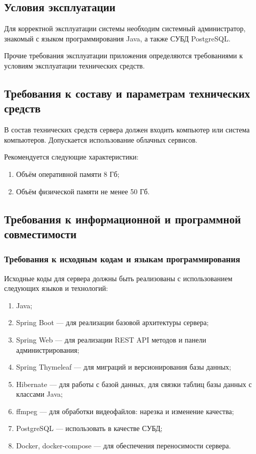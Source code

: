\subsection{Условия эксплуатации}

Для корректной эксплуатации системы необходим системный администратор, знакомый с языком программирования
Java, а также СУБД PostgreSQL.

Прочие требования эксплуатации приложения определяются требованиями к условиям эксплуатации технических средств.

\subsection{Требования к составу и параметрам технических средств}

В состав технических средств сервера должен входить компьютер или система компьютеров.
Допускается использование облачных сервисов.

Рекомендуется следующие характеристики:
\begin{enumerate}
    \item Объём оперативной памяти 8 Гб;
    \item Объём физической памяти не менее 50 Гб.
\end{enumerate}

\subsection{Требования к информационной и программной совместимости}

\subsubsection{Требования к исходным кодам и языкам программирования}

Исходные коды для сервера должны быть реализованы с использованием следующих языков и технологий:
\begin{enumerate}[noitemsep]
    \item Java;
    \item Spring Boot — для реализации базовой архитектуры сервера;
    \item Spring Web — для реализации REST API методов и панели администрирования;
    \item Spring Thymeleaf — для миграций и версионирования базы данных;
    \item Hibernate — для работы с базой данных, для связки таблиц базы данных с классами Java;
    \item ffmpeg — для обработки видеофайлов: нарезка и изменение качества;
    \item PostgreSQL — использовать в качестве СУБД;
    \item Docker, docker-compose — для обеспечения переносимости сервера.
\end{enumerate}

